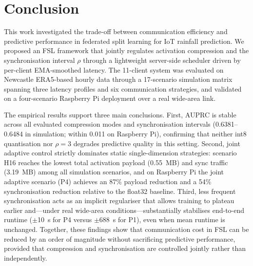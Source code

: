 \documentclass[conference]{IEEEtran}
\begin{document}
\section{Conclusion}
\label{sec:Conclusion}

This work investigated the trade-off between communication efficiency and predictive performance in federated split learning for IoT rainfall prediction. We proposed an FSL framework that jointly regulates activation compression and the synchronisation interval $\rho$ through a lightweight server-side scheduler driven by per-client EMA-smoothed latency. The 11-client system was evaluated on Newcastle ERA5-based hourly data through a 17-scenario simulation matrix spanning three latency profiles and six communication strategies, and validated on a four-scenario Raspberry Pi deployment over a real wide-area link.

The empirical results support three main conclusions. First, AUPRC is stable across all evaluated compression modes and synchronisation intervals (0.6381--0.6484 in simulation; within 0.011 on Raspberry Pi), confirming that neither int8 quantisation nor $\rho{=}3$ degrades predictive quality in this setting. Second, joint adaptive control strictly dominates static single-dimension strategies: scenario H16 reaches the lowest total activation payload (0.55~MB) and sync traffic (3.19~MB) among all simulation scenarios, and on Raspberry Pi the joint adaptive scenario (P4) achieves an 87\% payload reduction and a 54\% synchronisation reduction relative to the float32 baseline. Third, less frequent synchronisation acts as an implicit regulariser that allows training to plateau earlier and---under real wide-area conditions---substantially stabilises end-to-end runtime ($\pm$10~s for P4 versus $\pm$688~s for P1), even when mean runtime is unchanged. Together, these findings show that communication cost in FSL can be reduced by an order of magnitude without sacrificing predictive performance, provided that compression and synchronisation are controlled jointly rather than independently.
\end{document}

